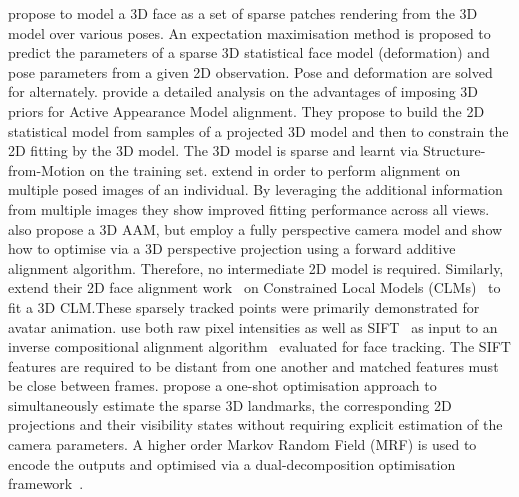 \citet{lie2006alignment} propose to model a 3D face as a set of sparse patches
rendering from the 3D model over various poses. An expectation maximisation
method is proposed to predict the parameters of a sparse 3D statistical face
model (deformation) and pose parameters from a given 2D observation. Pose
and deformation are solved for alternately.
\cite{Matthews:2007gb} provide a detailed analysis on the advantages
of imposing 3D priors for Active Appearance Model alignment. They propose to
build the 2D statistical model from samples of a projected 3D model and then
to constrain the 2D fitting by the 3D model. The 3D model is sparse and learnt
via Structure-from-Motion on the training set. \citet{Ramnath:2008jp} extend
\cite{Matthews:2007gb} in order to perform alignment on multiple posed
images of an individual. By leveraging the additional information from
multiple images they show improved fitting performance across all views.
\cite{Martins:2013hp} also propose a 3D AAM, but employ a fully perspective
camera model and show how to optimise via a 3D perspective projection
using a forward additive alignment algorithm. Therefore, no intermediate
2D model is required. Similarly, \citet{saragih2011real} extend their 2D
face alignment work~\cite{saragih2011deformable} on Constrained Local Models
(CLMs)~\cite{cristinacce2006feature} to fit a 3D CLM.\@ These sparsely
tracked points were primarily demonstrated for avatar animation.
\cite{Liao:2010fy} use both raw pixel intensities as well as
SIFT~\cite{lowe2004distinctive} as input to an inverse compositional alignment
algorithm~\cite{baker2004lucas} evaluated for face tracking. The SIFT features
are required to be distant from one another and matched features must be close
between frames.
\citet{Wang:2011kr} propose a one-shot optimisation approach to simultaneously
estimate the sparse 3D landmarks, the corresponding 2D projections and their
visibility states without requiring explicit estimation of the camera
parameters. A higher order Markov Random Field (MRF) is used to encode the
outputs and optimised via a dual-decomposition optimisation
framework~\cite{komodakis2007mrf}.

